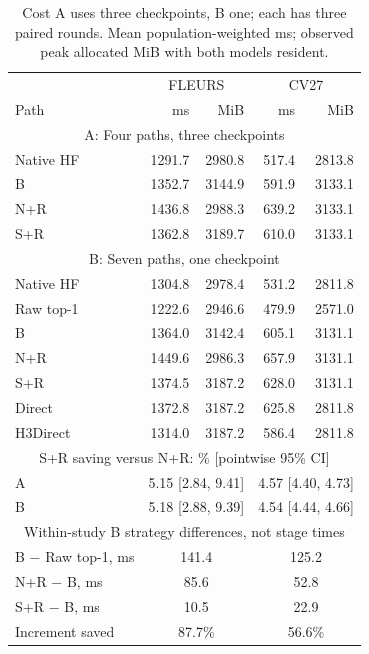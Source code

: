 \begin{table}[!b]\centering\footnotesize
\caption{Cost A uses three checkpoints, B one; each has three paired rounds. Mean population-weighted ms; observed peak allocated MiB with both models resident.}\label{tab:cost}
\setlength{\tabcolsep}{4pt}\renewcommand{\arraystretch}{1.03}
\begin{tabular}{@{}lrrrr@{}}\toprule
 & \multicolumn{2}{c}{FLEURS} & \multicolumn{2}{c}{CV27}\\
Path & ms & MiB & ms & MiB\\\midrule
\multicolumn{5}{c}{A: Four paths, three checkpoints}\\
Native HF & 1291.7 & 2980.8 & 517.4 & 2813.8\\
B & 1352.7 & 3144.9 & 591.9 & 3133.1\\
N+R & 1436.8 & 2988.3 & 639.2 & 3133.1\\
S+R & 1362.8 & 3189.7 & 610.0 & 3133.1\\
\midrule
\multicolumn{5}{c}{B: Seven paths, one checkpoint}\\
Native HF & 1304.8 & 2978.4 & 531.2 & 2811.8\\
Raw top-1 & 1222.6 & 2946.6 & 479.9 & 2571.0\\
B & 1364.0 & 3142.4 & 605.1 & 3131.1\\
N+R & 1449.6 & 2986.3 & 657.9 & 3131.1\\
S+R & 1374.5 & 3187.2 & 628.0 & 3131.1\\
Direct & 1372.8 & 3187.2 & 625.8 & 2811.8\\
H3Direct & 1314.0 & 3187.2 & 586.4 & 2811.8\\
\midrule
\multicolumn{5}{c}{S+R saving versus N+R: \% [pointwise 95\% CI]}\\
A & \multicolumn{2}{c}{5.15 [2.84, 9.41]} & \multicolumn{2}{c}{4.57 [4.40, 4.73]}\\
B & \multicolumn{2}{c}{5.18 [2.88, 9.39]} & \multicolumn{2}{c}{4.54 [4.44, 4.66]}\\
\midrule
\multicolumn{5}{c}{Within-study B strategy differences, not stage times}\\
B $-$ Raw top-1, ms & \multicolumn{2}{c}{141.4} & \multicolumn{2}{c}{125.2}\\
N+R $-$ B, ms & \multicolumn{2}{c}{85.6} & \multicolumn{2}{c}{52.8}\\
S+R $-$ B, ms & \multicolumn{2}{c}{10.5} & \multicolumn{2}{c}{22.9}\\
Increment saved & \multicolumn{2}{c}{87.7\%} & \multicolumn{2}{c}{56.6\%}\\
\bottomrule\end{tabular}\end{table}
